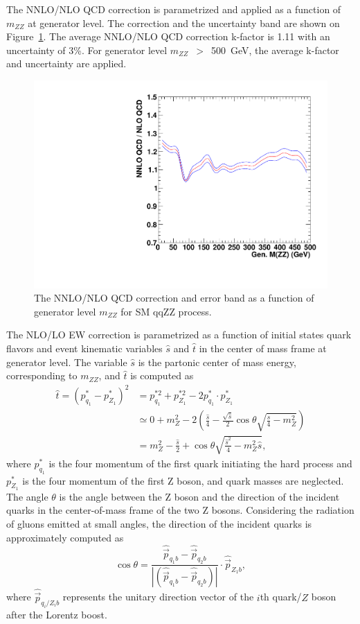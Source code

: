 \vspace{0.3cm}
The NNLO/NLO QCD correction is parametrized and applied as a function of $m_{ZZ}$ 
at generator level. 
The correction and the uncertainty band are shown on Figure~\ref{fig:qqzz_nnlo_qcd}.
The average NNLO/NLO QCD correction k-factor is 1.11 with an uncertainty of 3\%.
For generator level $m_{ZZ}$~$>$~500~GeV, the average k-factor and uncertainty are applied. 

\begin{figure}[htbp!]
\centering
  \includegraphics[width=0.48\linewidth]{figures/h_nnlo_to_nlo_vs_mzz.pdf}
  \caption{The NNLO/NLO QCD correction and error band as a function of generator level $m_{ZZ}$ for SM qqZZ process.}
  \label{fig:qqzz_nnlo_qcd}
\end{figure}

\vspace{0.3cm}
The NLO/LO EW correction is parametrized as a function of initial states quark flavors and event kinematic variables $\hat{s}$ and $\hat{t}$
in the center of mass frame at generator level. 
The variable $\hat{s}$ is the partonic center of mass energy, corresponding to $m_{ZZ}$,
and $\hat{t}$ is computed as
\begin{align*}
\hat{t} = \left(p^*_{q_1}-p^*_{Z_1}\right)^2 & = p_{q_1}^{*2} +
p_{Z_1}^{*2} - 2 p^*_{q_1} \cdot p^*_{Z_1} \\
& \simeq 0 + m_{Z}^{2} - 2 \left( \frac{\hat{s}}{4} -
\frac{\sqrt{\hat{s}}}{2} \cos{\theta} \sqrt{\frac{\hat{s}}{4} -
m_{Z}^{2}} \right) \\
& = m_{Z}^{2} - \frac{\hat{s}}{2} + \cos{\theta}
\sqrt{\frac{\hat{s}^2}{4} - m_{Z}^{2}\hat{s}},
\end{align*}
where $p^*_{q_1}$ is the four momentum of the first quark initiating the hard process and 
$p^*_{Z_1}$  is the four momentum of the first Z boson, and quark masses are neglected.
The angle $\theta$ is the angle between the Z boson and the direction of the
incident quarks in the center-of-mass frame of the two Z bosons. 
Considering the radiation of gluons emitted at small angles, the direction of the incident
quarks is approximately computed as 
\begin{equation*}
\cos{\theta} = \frac{\hat{\vec{p}}_{q_1b} -
\hat{\vec{p}}_{q_2b}}{\left|\left( \hat{\vec{p}}_{q_1b} -
\hat{\vec{p}}_{q_2b} \right)\right|} \cdot \hat{\vec{p}}_{Z_1b},
\end{equation*}
where $\hat{\vec{p}}_{q_i/Z_ib}$ represents the unitary direction vector of the
$i$th quark/$Z$ boson after the Lorentz boost. 

